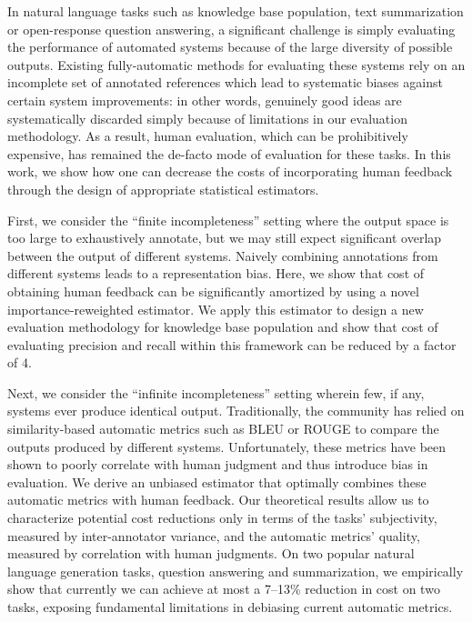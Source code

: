 In natural language tasks such as knowledge base population, text summarization or open-response question answering, a significant challenge is simply evaluating the performance of automated systems because of the large diversity of possible outputs.
Existing fully-automatic methods for evaluating these systems rely on an incomplete  set of annotated references which lead to systematic biases against certain system improvements: in other words, genuinely good ideas are systematically discarded simply because of limitations in our evaluation methodology.
As a result, human evaluation, which can be prohibitively expensive, has remained the de-facto  mode of evaluation for these tasks.
In this work, we show how one can decrease the costs of incorporating human feedback through the design of appropriate statistical estimators. 
%

First, we consider the ``finite incompleteness'' setting where the output space is too large to exhaustively annotate, but we may still expect significant overlap between the output of different systems. 
Naively combining annotations from different systems leads to a representation bias.
Here, we show that cost of obtaining human feedback can be significantly amortized by using a novel importance-reweighted estimator.  
We apply this estimator to design a new evaluation methodology for knowledge base population and show that cost of evaluating precision and recall within this framework can be reduced by a factor of 4.

Next, we consider the ``infinite incompleteness'' setting wherein few, if any, systems ever produce identical output.
Traditionally, the community has relied on similarity-based automatic metrics such as BLEU or ROUGE to compare the outputs produced by different systems.
Unfortunately, these metrics have been shown to poorly correlate with human judgment and thus introduce bias in evaluation.
We derive an unbiased estimator that optimally combines these automatic metrics with human feedback.
Our theoretical results allow us to characterize potential cost reductions only in terms of the tasks' subjectivity, measured by inter-annotator variance, and the automatic metrics' quality, measured by correlation with human judgments.
On two popular natural language generation tasks, question answering and summarization, we empirically show that currently we can achieve at most a 7--13\% reduction in cost on two tasks, exposing fundamental limitations in debiasing current automatic metrics.

